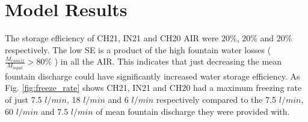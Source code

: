 \documentclass[utf8]{frontiersSCNS} %
\begin{document}
%     

\section{Model Results} 
The storage efficiency of CH21, IN21 and CH20 AIR were $20\%$, $20\%$ and $20\%$ respectively. The low SE is a product
of the high  fountain water losses ( $\frac{M_{runoff}}{M_{input}}> 80 \%$ ) in all the AIR. This indicates that just
decreasing the mean fountain discharge could have significantly increased water storage efficiency. As Fig.
\ref{fig:freeze_rate} shows CH21, IN21 and CH20 had a maximum freezing rate of just 7.5 $l/min$, 18 $l/min$ and 6
$l/min$ respectively compared to the 7.5 $l/min$, 60 $l/min$ and 7.5 $l/min$ of mean fountain discharge they were
provided with.
\end{document}
